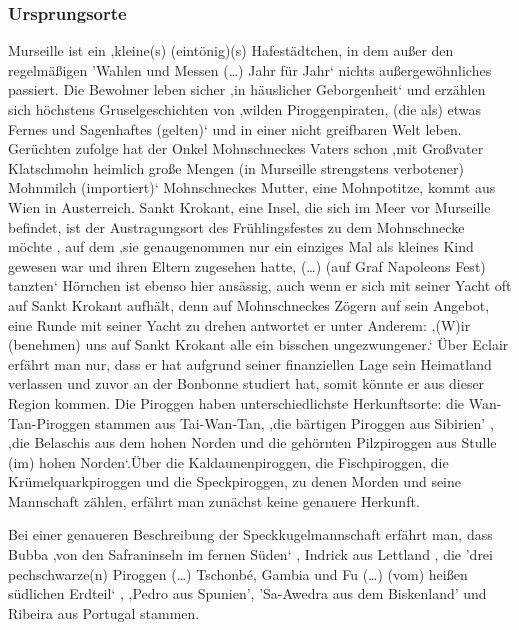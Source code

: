 \subsubsection{Ursprungsorte}

Murseille ist ein ‚kleine(s) (eintönig)(s) Hafestädtchen, in dem außer den regelmäßigen 'Wahlen und Messen (…) Jahr für Jahr‘ \cite[S. 10]{pir} nichts außergewöhnliches passiert. Die Bewohner leben sicher ‚in häuslicher Geborgenheit‘ und erzählen sich höchstens Gruselgeschichten von ‚wilden Piroggenpiraten, (die als) etwas Fernes und Sagenhaftes (gelten)‘ \cite[S.10]{pir} und in einer nicht greifbaren Welt leben. Gerüchten zufolge hat der Onkel Mohnschneckes Vaters schon ‚mit Großvater Klatschmohn heimlich große Mengen (in Murseille strengstens verbotener) Mohnmilch (importiert)‘\cite[S.14]{pir} Mohnschneckes Mutter, eine Mohnpotitze, kommt aus Wien in Austerreich. \cite[S. 13]{pir} Sankt Krokant, eine Insel, die sich im Meer vor Murseille befindet, ist der Austragungsort des Frühlingsfestes zu dem Mohnschnecke möchte \cite[S.17]{pir}, auf dem ‚sie genaugenommen nur ein einziges Mal als kleines Kind gewesen war und ihren Eltern zugesehen hatte, (…) (auf Graf Napoleons Fest) tanzten‘ \cite[S.521]{pir} 
Hörnchen ist ebenso hier ansässig, auch wenn er sich mit seiner Yacht oft auf Sankt Krokant aufhält, denn auf Mohnschneckes Zögern auf sein Angebot, eine Runde mit seiner Yacht zu drehen antwortet er unter Anderem: ‚(W)ir (benehmen) uns auf Sankt Krokant alle ein bisschen ungezwungener.‘\cite[S.25]{pir} 
Über Eclair erfährt man nur, dass er hat aufgrund seiner finanziellen Lage sein Heimatland verlassen und zuvor an der Bonbonne studiert hat, somit könnte er aus dieser Region kommen. \cite[S.15f]{pir}
Die Piroggen haben unterschiedlichste Herkunftsorte: die Wan-Tan-Piroggen stammen aus Tai-Wan-Tan, \cite[S.8]{pir}
 ‚die bärtigen Piroggen aus Sibirien' \cite[S.8]{pir}, ‚die Belaschis aus dem hohen Norden \cite[S.9]{pir} und die gehörnten Pilzpiroggen aus Stulle (im) hohen Norden‘\cite[S.9]{pir}.Über die Kaldaunenpiroggen, die Fischpiroggen, die Krümelquarkpiroggen und die Speckpiroggen, zu denen Morden und seine Mannschaft zählen, erfährt man zunächst keine genauere Herkunft. \cite[S.9f]{pir}

Bei einer genaueren Beschreibung der Speckkugelmannschaft erfährt man, dass Bubba ‚von den Safraninseln im fernen Süden‘ \cite[S.46]{pir}, Indrick aus Lettland \cite[S.46f]{pir}, die 'drei pechschwarze(n) Piroggen (…) Tschonbé, Gambia und Fu (…) (vom) heißen südlichen Erdteil‘ \cite[S.47]{pir}, ‚Pedro aus Spunien'\cite[S.47]{pir}, 'Sa-Awedra aus dem Biskenland' \cite[S.47]{pir} und Ribeira aus Portugal \cite[S.47]{pir} stammen.


